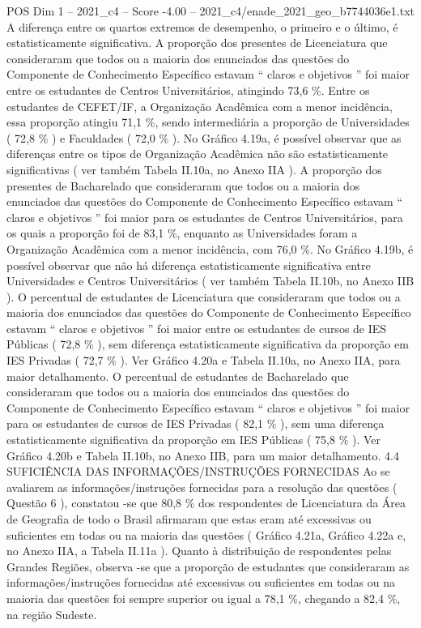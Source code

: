 \begin{textsample}{POS Dim 1 – 2021\_c4 – Score -4.00 – 2021\_c4/enade\_2021\_geo\_b7744036e1.txt}
A diferença entre os quartos extremos de desempenho, o primeiro e o último, é estatisticamente significativa.
A proporção dos presentes de Licenciatura que consideraram que todos ou a maioria dos enunciados das questões do Componente de Conhecimento Específico estavam “ claros e objetivos ” foi maior entre os estudantes de Centros Universitários, atingindo 73,6 \%.
Entre os estudantes de CEFET/IF, a Organização Acadêmica com a menor incidência, essa proporção atingiu 71,1 \%, sendo intermediária a proporção de Universidades ( 72,8 \% ) e Faculdades ( 72,0 \% ).
No Gráfico 4.19a, é possível observar que as diferenças entre os tipos de Organização Acadêmica não são estatisticamente significativas ( ver também Tabela II.10a, no Anexo IIA ).
A proporção dos presentes de Bacharelado que consideraram que todos ou a maioria dos enunciados das questões do Componente de Conhecimento Específico estavam “ claros e objetivos ” foi maior para os estudantes de Centros Universitários, para os quais a proporção foi de 83,1 \%, enquanto as Universidades foram a Organização Acadêmica com a menor incidência, com 76,0 \%.
No Gráfico 4.19b, é possível observar que não há diferença estatisticamente significativa entre Universidades e Centros Universitários ( ver também Tabela II.10b, no Anexo IIB ).
O percentual de estudantes de Licenciatura que consideraram que todos ou a maioria dos enunciados das questões do Componente de Conhecimento Específico estavam “ claros e objetivos ” foi maior entre os estudantes de cursos de IES Públicas ( 72,8 \% ), sem diferença estatisticamente significativa da proporção em IES Privadas ( 72,7 \% ).
Ver Gráfico 4.20a e Tabela II.10a, no Anexo IIA, para maior detalhamento.
O percentual de estudantes de Bacharelado que consideraram que todos ou a maioria dos enunciados das questões do Componente de Conhecimento Específico estavam “ claros e objetivos ” foi maior para os estudantes de cursos de IES Privadas ( 82,1 \% ), sem uma diferença estatisticamente significativa da proporção em IES Públicas ( 75,8 \% ).
Ver Gráfico 4.20b e Tabela II.10b, no Anexo IIB, para um maior detalhamento. 4.4 SUFICIÊNCIA DAS INFORMAÇÕES/INSTRUÇÕES FORNECIDAS Ao se avaliarem as informações/instruções fornecidas para a resolução das questões ( Questão 6 ), constatou -se que 80,8 \% dos respondentes de Licenciatura da Área de Geografia de todo o Brasil afirmaram que estas eram até excessivas ou suficientes em todas ou na maioria das questões ( Gráfico 4.21a, Gráfico 4.22a e, no Anexo IIA, a Tabela II.11a ).
Quanto à distribuição de respondentes pelas Grandes Regiões, observa -se que a proporção de estudantes que consideraram as informações/instruções fornecidas até excessivas ou suficientes em todas ou na maioria das questões foi sempre superior ou igual a 78,1 \%, chegando a 82,4 \%, na região Sudeste.

\end{textsample}
